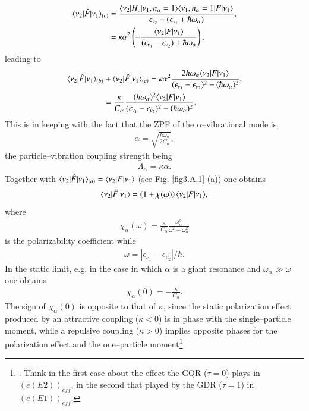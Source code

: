 \begin{subappendices}
\begin{align}
\nonumber \langle {\nu_2|\hat F|\nu_1} \rangle_{(c)}&=\frac{\langle {\nu_2|H_c|\nu_1,n_\alpha=1} \rangle\langle {\nu_1,n_\alpha=1| F|\nu_1} \rangle}{\epsilon_{\nu_2}-(\epsilon_{\nu_1}+\hbar\omega_\alpha)},\\
&=\kappa\alpha^2\left(-\frac{\langle {\nu_2|F|\nu_1} \rangle}{(\epsilon_{\nu_1}-\epsilon_{\nu_2})+\hbar\omega_\alpha}\right),
\end{align}
leading to 
\begin{align}
\nonumber \langle {\nu_2|\hat F|\nu_1} \rangle_{(b)}&+\langle {\nu_2|\hat F|\nu_1} \rangle_{(c)}=\kappa\alpha^2\frac{2\hbar \omega_\alpha\langle {\nu_2|F|\nu_1} \rangle}{(\epsilon_{\nu_1}-\epsilon_{\nu_2})^2-(\hbar\omega_\alpha)^2},\\
&=\frac{\kappa}{C_\alpha}\frac{(\hbar\omega_\alpha)^2\langle {\nu_2|F|\nu_1} \rangle}{(\epsilon_{\nu_1}-\epsilon_{\nu_2})^2-(\hbar\omega_\alpha)^2}.
\end{align}
This is in keeping with the fact that the ZPF of the $\alpha$--vibrational mode is,
\begin{align}
\alpha=\sqrt{\frac{\hbar\omega_\alpha}{2C_\alpha}},
\end{align}
the particle--vibration coupling strength being
\begin{align}
\Lambda_\alpha=\kappa\alpha.
\end{align}
Together with $\langle {\nu_2|\hat F|\nu_1} \rangle_{(a)}=\langle {\nu_2|F|\nu_1} \rangle$ (see Fig. \ref{fig3.A.1} (a)) one obtains
\begin{align}\label{eq3.A.12}
\langle {\nu_2|\hat F|\nu_1} \rangle=\left(1+\chi(\omega)\right)\langle {\nu_2|F|\nu_1} \rangle,
\end{align}
where
\begin{align}\label{eq3.A.13}
 \chi_\alpha(\omega)=\frac{\kappa}{C_\alpha}\frac{\omega_\alpha^2}{\omega^2-\omega_\alpha^2}
\end{align}
is the polarizability coefficient while
\begin{align}\label{eq3.A.14}
\omega=|\epsilon_{\nu_1}-\epsilon_{\nu_2}|/\hbar.
\end{align}
In the static limit, e.g. in the case in which $\alpha$ is a giant resonance and $\omega_\alpha\gg\omega$ one obtains
\begin{align}\label{eq3.A.15}
\chi_\alpha(0)=-\frac{\kappa}{C_\alpha}.
\end{align}
The sign of $\chi_\alpha(0)$ is opposite to that of $\kappa$, since the static polarization effect produced by an attractive coupling ($\kappa<0$) is in phase with the single--particle moment, while a repulsive coupling ($\kappa>0$) implies opposite phases for the polarization effect and the one--particle moment\footnote{\cite{Bohr:75,Mottelson:62}. Think in the first case about the effect the GQR ($\tau=0$) plays in $(e(E2))_{eff}$, in the second that played by the GDR ($\tau=1$) in $(e(E1))_{eff}$.}.




\end{subappendices}
